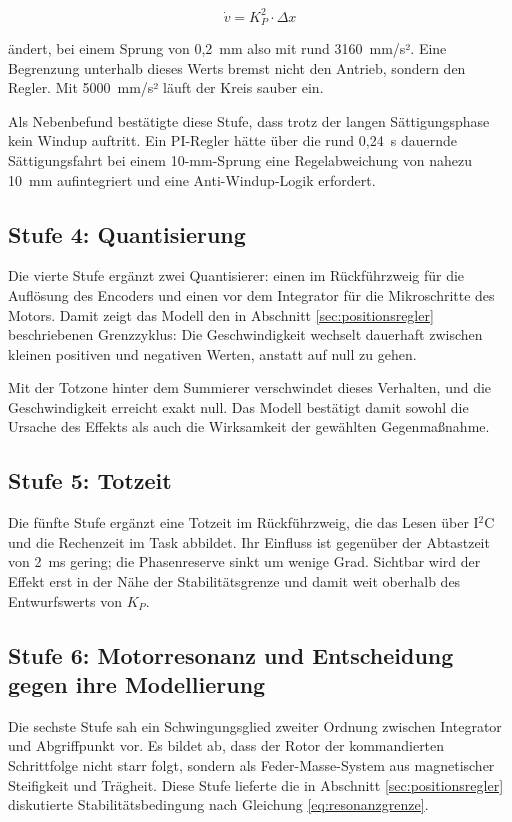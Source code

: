 \begin{equation}
    \dot{v} = K_P^2 \cdot \Delta x
    \label{eq:reglerbeschleunigung}
\end{equation}

ändert, bei einem Sprung von 0,2~mm also mit rund 3160~mm/s². Eine Begrenzung unterhalb
dieses Werts bremst nicht den Antrieb, sondern den Regler. Mit 5000~mm/s² läuft der Kreis
sauber ein.

Als Nebenbefund bestätigte diese Stufe, dass trotz der langen Sättigungsphase kein Windup
auftritt. Ein PI-Regler hätte über die rund 0,24~s dauernde Sättigungsfahrt bei einem
10-mm-Sprung eine Regelabweichung von nahezu 10~mm aufintegriert und eine
Anti-Windup-Logik erfordert.

\subsection*{Stufe 4: Quantisierung}

Die vierte Stufe ergänzt zwei Quantisierer: einen im Rückführzweig für die Auflösung des
Encoders und einen vor dem Integrator für die Mikroschritte des Motors. Damit zeigt das
Modell den in Abschnitt \ref{sec:positionsregler} beschriebenen Grenzzyklus: Die
Geschwindigkeit wechselt dauerhaft zwischen kleinen positiven und negativen Werten,
anstatt auf null zu gehen.

Mit der Totzone hinter dem Summierer verschwindet dieses Verhalten, und die
Geschwindigkeit erreicht exakt null. Das Modell bestätigt damit sowohl die Ursache des
Effekts als auch die Wirksamkeit der gewählten Gegenmaßnahme.

\subsection*{Stufe 5: Totzeit}

Die fünfte Stufe ergänzt eine Totzeit im Rückführzweig, die das Lesen über I$^2$C und die
Rechenzeit im Task abbildet. Ihr Einfluss ist gegenüber der Abtastzeit von 2~ms gering;
die Phasenreserve sinkt um wenige Grad. Sichtbar wird der Effekt erst in der Nähe der
Stabilitätsgrenze und damit weit oberhalb des Entwurfswerts von $K_P$.

\subsection*{Stufe 6: Motorresonanz und Entscheidung gegen ihre Modellierung}

Die sechste Stufe sah ein Schwingungsglied zweiter Ordnung zwischen Integrator und
Abgriffpunkt vor. Es bildet ab, dass der Rotor der kommandierten Schrittfolge nicht starr
folgt, sondern als Feder-Masse-System aus magnetischer Steifigkeit und Trägheit. Diese
Stufe lieferte die in Abschnitt \ref{sec:positionsregler} diskutierte
Stabilitätsbedingung nach Gleichung \ref{eq:resonanzgrenze}.


